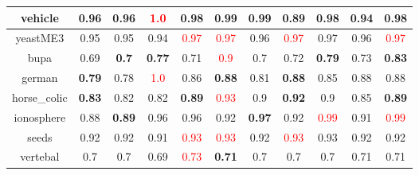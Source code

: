 \documentclass{article}%
\begin{document}
\begin{tabular}{c|cccccccccc}
\hline%
vehicle&0.96&0.96&\textcolor{red}{ 
1.0
}&0.98&0.99&0.99&0.89&\textbf{0.98}&0.94&\textbf{0.98}\\%
\hline%
yeastME3&0.95&0.95&0.94&\textcolor{red}{ 
0.97
}&\textcolor{red}{ 
0.97
}&0.96&\textcolor{red}{ 
0.97
}&0.97&0.96&\textcolor{red}{ 
0.97
}\\%
\hline%
bupa&0.69&\textbf{0.7}&\textbf{0.77}&0.71&\textcolor{red}{ 
0.9
}&0.7&0.72&\textbf{0.79}&0.73&\textbf{0.83}\\%
\hline%
german&\textbf{0.79}&0.78&\textcolor{red}{ 
1.0
}&0.86&\textbf{0.88}&0.81&\textbf{0.88}&0.85&0.88&0.88\\%
\hline%
horse\_colic&\textbf{0.83}&0.82&0.82&\textbf{0.89}&\textcolor{red}{ 
0.93
}&0.9&\textbf{0.92}&0.9&0.85&\textbf{0.89}\\%
\hline%
ionosphere&0.88&\textbf{0.89}&0.96&0.96&0.92&\textbf{0.97}&0.92&\textcolor{red}{ 
0.99
}&0.91&\textcolor{red}{ 
0.99
}\\%
\hline%
seeds&0.92&0.92&0.91&\textcolor{red}{ 
0.93
}&\textcolor{red}{ 
0.93
}&0.92&\textcolor{red}{ 
0.93
}&0.93&0.92&0.92\\%
\hline%
vertebal&0.7&0.7&0.69&\textcolor{red}{ 
0.73
}&\textbf{0.71}&0.7&0.7&0.7&0.71&0.71\\%
\hline%
\end{tabular}

%
\end{document}
